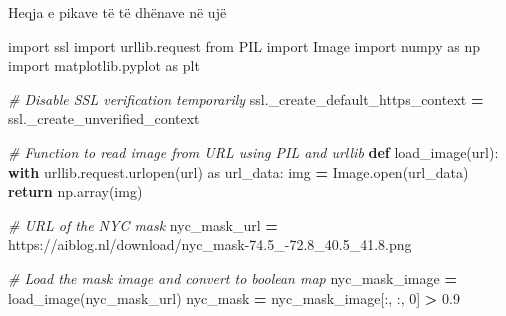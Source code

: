 \documentclass[
  ignorenonframetext,
]{beamer}
\newenvironment{Shaded}{\begin{snugshade}}{\end{snugshade}}
\newcommand{\BuiltInTok}[1]{#1}
\newcommand{\CommentTok}[1]{\textcolor[rgb]{0.56,0.35,0.01}{\textit{#1}}}
\newcommand{\ControlFlowTok}[1]{\textcolor[rgb]{0.13,0.29,0.53}{\textbf{#1}}}
\newcommand{\DecValTok}[1]{\textcolor[rgb]{0.00,0.00,0.81}{#1}}
\newcommand{\FloatTok}[1]{\textcolor[rgb]{0.00,0.00,0.81}{#1}}
\newcommand{\ImportTok}[1]{#1}
\newcommand{\KeywordTok}[1]{\textcolor[rgb]{0.13,0.29,0.53}{\textbf{#1}}}
\newcommand{\NormalTok}[1]{#1}
\newcommand{\OperatorTok}[1]{\textcolor[rgb]{0.81,0.36,0.00}{\textbf{#1}}}
\newcommand{\StringTok}[1]{\textcolor[rgb]{0.31,0.60,0.02}{#1}}
\begin{document}
\begin{frame}[fragile]{Heqja e pikave të të dhënave në ujë}
\protect\hypertarget{heqja-e-pikave-tuxeb-tuxeb-dhuxebnave-nuxeb-ujuxeb-1}{}

\begin{Shaded}
\begin{Highlighting}[]
\ImportTok{import}\NormalTok{ ssl}
\ImportTok{import}\NormalTok{ urllib.request}
\ImportTok{from}\NormalTok{ PIL }\ImportTok{import}\NormalTok{ Image}
\ImportTok{import}\NormalTok{ numpy }\ImportTok{as}\NormalTok{ np}
\ImportTok{import}\NormalTok{ matplotlib.pyplot }\ImportTok{as}\NormalTok{ plt}

\CommentTok{\# Disable SSL verification temporarily}
\NormalTok{ssl.\_create\_default\_https\_context }\OperatorTok{=}\NormalTok{ ssl.\_create\_unverified\_context}

\CommentTok{\# Function to read image from URL using PIL and urllib}
\KeywordTok{def}\NormalTok{ load\_image(url):}
    \ControlFlowTok{with}\NormalTok{ urllib.request.urlopen(url) }\ImportTok{as}\NormalTok{ url\_data:}
\NormalTok{        img }\OperatorTok{=}\NormalTok{ Image.}\BuiltInTok{open}\NormalTok{(url\_data)}
        \ControlFlowTok{return}\NormalTok{ np.array(img)}

\CommentTok{\# URL of the NYC mask}
\NormalTok{nyc\_mask\_url }\OperatorTok{=} \StringTok{\textquotesingle{}https://aiblog.nl/download/nyc\_mask{-}74.5\_{-}72.8\_40.5\_41.8.png\textquotesingle{}}

\CommentTok{\# Load the mask image and convert to boolean map}
\NormalTok{nyc\_mask\_image }\OperatorTok{=}\NormalTok{ load\_image(nyc\_mask\_url)}
\NormalTok{nyc\_mask }\OperatorTok{=}\NormalTok{ nyc\_mask\_image[:, :, }\DecValTok{0}\NormalTok{] }\OperatorTok{\textgreater{}} \FloatTok{0.9}
\end{Highlighting}
\end{Shaded}
\end{frame}
\end{document}
